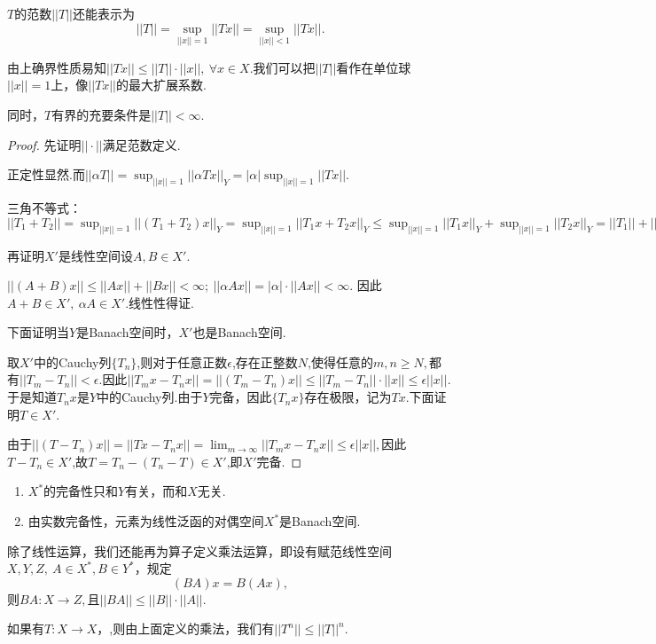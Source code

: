 \documentclass[lang=cn,10pt]{elegantbook}
\begin{document}
	\begin{note}
		\(T\)的范数\(||T||\)还能表示为
		\[||T||=\sup_{||x||=1}||Tx||=\sup_{||x||<1}||Tx||.\]
		
		由上确界性质易知\(||Tx||\le ||T||\cdot||x||,\ \forall x\in X.\)我们可以把\(||T||\)看作在单位球\(||x||=1\)上，像\(||Tx||\)的最大扩展系数.
		
		同时，\(T\)有界的充要条件是\(||T||<\infty.\)
	\end{note}
	\begin{proof}
		先证明\(||\cdot||\)满足范数定义.
		
		正定性显然.而\(||\alpha T||=\sup_{||x||=1}||\alpha Tx||_Y=|\alpha|\sup_{||x||=1}||Tx||.\)
		
		三角不等式：\(||T_1+T_2||=\sup_{||x||=1}||(T_1+T_2)x||_Y=\sup_{||x||=1}||T_1x+T_2x||_Y\le \sup_{||x||=1}||T_1x||_Y+\sup_{||x||=1}||T_2x||_Y=||T_1||+||T_2||.\)
		
		再证明\(X'\)是线性空间设\(A,B\in X'\).
		
		\(||(A+B)x||\le ||Ax||+||Bx||<\infty;\ ||\alpha Ax||=|\alpha|\cdot||Ax||<\infty.\)
		因此\(A+B\in X',\ \alpha A\in X'.\)线性性得证.
		
		下面证明当\(Y\)是Banach空间时，\(X'\)也是Banach空间.
		
		取\(X'\)中的Cauchy列\(\{T_n\}\),则对于任意正数\(\epsilon\),存在正整数\(N\),使得任意的\(m,n\ge N,\)都有\(||T_m-T_n||<\epsilon.\)因此\(||T_mx-T_nx||=||(T_m-T_n)x||\le ||T_m-T_n||\cdot||x||\le\epsilon||x||.\)于是知道\(T_nx\)是\(Y\)中的Cauchy列.由于\(Y\)完备，因此\(\{T_nx\}\)存在极限，记为\(Tx\).下面证明\(T\in X'.\)
		
		由于\(||(T-T_n)x||=||Tx-T_nx||=\lim_{m\to \infty}||T_mx-T_nx||\le \epsilon||x||,\)因此\(T-T_n\in X'\),故\(T=T_n-(T_n-T)\in X'\),即\(X'\)完备.
	\end{proof}
	\begin{note}
		\begin{enumerate}
			\item \(X^*\)的完备性只和\(Y\)有关，而和\(X\)无关.
			\item 由实数完备性，元素为线性泛函的对偶空间\(X^*\)是Banach空间.
		\end{enumerate}
	\end{note}
	除了线性运算，我们还能再为算子定义乘法运算，即设有赋范线性空间\(X,Y,Z,\ A\in X^*,B\in Y^*\)，规定
	\[(BA)x=B(Ax),\]
	则\(BA:X\to Z,\)且\(||BA||\le ||B||\cdot||A||.\)
	
	如果有\(T:X\to X，\),则由上面定义的乘法，我们有\(||T^n||\le||T||^n.\)
	
\end{document}
